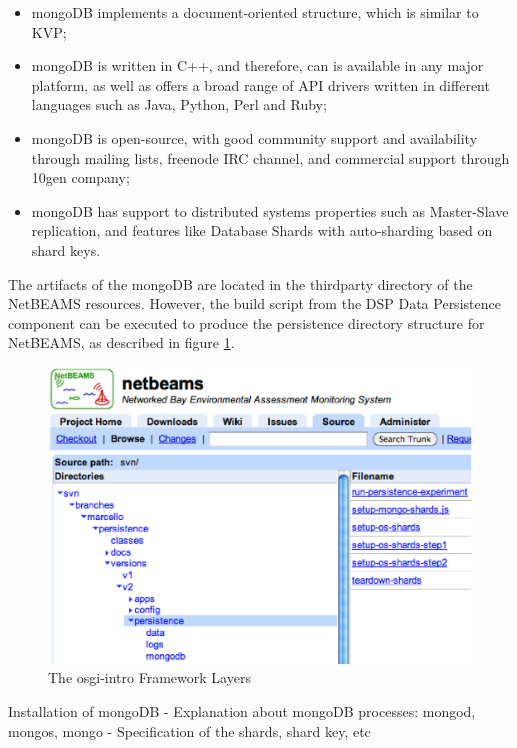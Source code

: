 \begin{itemize}
  \item mongoDB implements a document-oriented structure, which is similar to
  KVP;
  \item mongoDB is written in C++, and therefore, can is available in any major
  platform, as well as offers a broad range of API drivers written in different
  languages such as Java, Python, Perl and Ruby; 
  \item mongoDB is open-source, with good community support and availability
  through mailing lists, freenode IRC channel, and commercial support through
  10gen company; 
  \item mongoDB has support to distributed systems properties such as
  Master-Slave replication, and features like Database Shards with
  auto-sharding based on shard keys.
\end{itemize}

The artifacts of the mongoDB are located in the thirdparty directory of the
NetBEAMS resources. However, the build script from the DSP Data Persistence
component can be executed to produce the persistence directory
structure for NetBEAMS, as described in figure
\ref{fig:dsp-persistence-system-dir}.

\begin{figure}[!h]
  \centering
  \includegraphics[scale=0.5]{../diagrams/dsp-persistence-system-dir}
  \caption{The osgi-intro Framework Layers}
  \label{fig:dsp-persistence-system-dir}
\end{figure}

Installation of mongoDB
- Explanation about mongoDB processes: mongod, mongos, mongo
- Specification of the shards, shard key, etc

